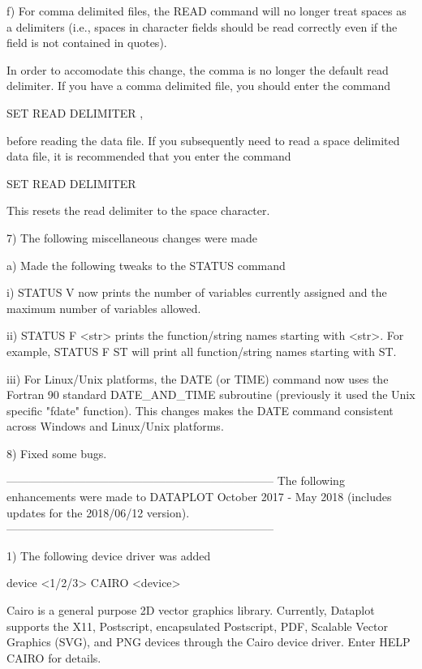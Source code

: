    f) For comma delimited files, the READ command will no longer treat
       spaces as a delimiters (i.e., spaces in character fields should be
       read correctly even if the field is not contained in quotes).

       In order to accomodate this change, the comma is no longer the
       default read delimiter.  If you have a comma delimited file, you
       should enter the command

           SET READ DELIMITER ,

       before reading the data file.  If you subsequently need to read
       a space delimited data file, it is recommended that you enter the
       command

           SET READ DELIMITER

       This resets the read delimiter to the space character.

 7) The following miscellaneous changes were made

    a) Made the following tweaks to the STATUS command

        i) STATUS V now prints the number of variables currently
           assigned and the maximum number of variables allowed.

       ii) STATUS F <str> prints the function/string names starting with
           <str>.  For example, STATUS F ST will print all function/string
           names starting with ST.

      iii) For Linux/Unix platforms, the DATE (or TIME) command now
           uses the Fortran 90 standard DATE_AND_TIME subroutine
           (previously it used the Unix specific "fdate" function).
           This changes makes the DATE command consistent across
           Windows and Linux/Unix platforms.

 8) Fixed some bugs.

-----------------------------------------------------------------------
The following enhancements were made to DATAPLOT
October 2017 - May 2018 (includes updates for the 2018/06/12 version).
-----------------------------------------------------------------------

 1) The following device driver was added

        device <1/2/3> CAIRO <device>

    Cairo is a general purpose 2D vector graphics library.  Currently,
    Dataplot supports the X11, Postscript, encapsulated Postscript,
    PDF, Scalable Vector Graphics (SVG), and PNG devices through
    the Cairo device driver.  Enter HELP CAIRO for details.

